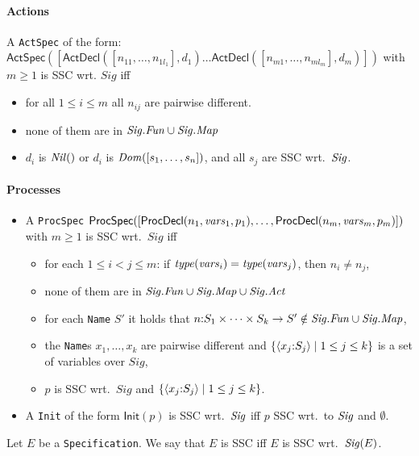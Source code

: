 \documentclass[fleqn,a4paper,dvips]{article}
\newcommand{\aterm}[1]{\mathsf{#1}}
\newcommand{\Sig}{\nm{Sig}}
\newcommand{\Fun}{\nm{Fun}}
\begin{document}
\paragraph{Actions}
  A {\tt ActSpec} of the form:\\
$\aterm{ActSpec}([\aterm{ActDecl}([n_{11},\dots,n_{1l_1}],d_1)\dots\aterm{ActDecl}([n_{m1},\dots,n_{ml_m}],d_m)])$
with $m\geq 1$ is SSC wrt. $Sig$ iff
\begin{itemize}
\item for all $1\leq i\leq m$ all $n_{ij}$ are pairwise different.
\item none of them are in $\Sig.\Fun\cup\Sig.\Map$
\item $d_i$ is $\mathit{Nil}()$ or $d_i$ is $\mathit{Dom}([s_1,\dots,s_n])$, and all $s_j$ are SSC wrt.\ $\Sig$.
\end{itemize}

\paragraph{Processes}
\begin{itemize}
\item
  A {\tt ProcSpec} 
  $\aterm{ProcSpec}([\aterm{ProcDecl}(n_1,\nm{vars}_1,p_1),\dots,\aterm{ProcDecl}(n_m,\nm{vars}_m,p_m)])$
  with $m\geq 1$ is SSC wrt.\ $Sig$ iff
  \begin{itemize}
  \item
    for each $1\leq i<j\leq m$:
    if $\mathit{type}(\mathit{vars}_i)=\mathit{type}(\mathit{vars}_j)$, then $n_i\neq n_j$,
  \item none of them are in $\Sig.\Fun\cup\Sig.\Map\cup\Sig.\Act$
  \item
    for each {\tt Name} $S'$ it holds that $n\ap S_{1}\times\cdots\times
    S_{k}\rightarrow S'\notin \Sig.\Fun\cup\Sig.\Map$,
  \item the {\tt Name}s $x_{1},\ldots,x_{k}$ are pairwise different
    and $\{\langle x_{j}{:} S_{j}\rangle\mid 1\leq j\leq k\}$ is a set
    of variables over $Sig$,
  \item $p$ is SSC wrt.\ $Sig$ and $\{\langle
    x_{j}{:} S_{j}\rangle\mid 1\leq j\leq k\}$.
  \end{itemize}
\item
  A {\tt Init} of the form $\aterm{Init}(p)$ is SSC wrt.\ $\Sig$ 
  iff $p$ SSC wrt.\ to $\Sig$ and $\emptyset$.
\end{itemize}

\begin{defn}\label{def:SSC-mCRL}
  Let $E$ be a {\tt Specification}. We say that $E$ is SSC iff $E$ is SSC
  wrt.\ $\Sig(E)$.
\end{defn}
\end{document}
